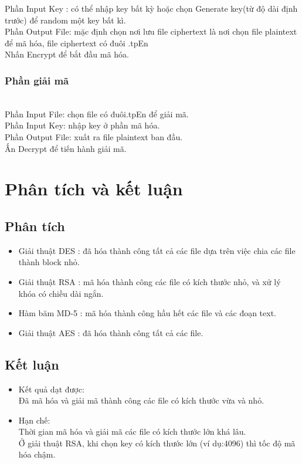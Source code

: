 \documentclass[paper=a4, fontsize=11pt]{scrartcl}	%
\numberwithin{equation}{section}															%
\numberwithin{figure}{section}																%
\numberwithin{table}{section}																%
\begin{document}
 		
		Phần Input Key : có thể nhập key bất kỳ hoặc chọn Generate key(từ độ dài định trước) để random một key bất kì.\\
		
		
		Phần Output File: mặc định chọn nơi lưu file ciphertext là nơi chọn file plaintext để mã hóa, file ciphertext có đuôi .tpEn\\
			
			
		Nhấn Encrypt để bắt đầu mã hóa.
 		\subsubsection{Phần giải mã}\\
 		Phần Input File: chọn file có đuôi.tpEn để giải mã.\\
 		
		Phần Input Key: nhập key ở phần mã hóa.\\
			
		Phần Output File: xuất ra file plaintext ban đầu.\\
		
		Ấn Decrypt để tiến hành giải mã.
\section{Phân tích và kết luận}
	
	\subsection{Phân tích}
	\begin{itemize}
		\item Giải thuật DES : đã hóa thành công tất cả các file dựa trên việc chia các file thành block nhỏ.
		\item Giải thuật RSA : mã hóa thành công các file có kích thước nhỏ, và xử lý khóa có chiều dài ngắn.
		\item Hàm băm MD-5 : mã hóa thành công hầu hết các file và các đoạn text.
		\item Giải thuật AES : đã hóa thành công tất cả các file.
	\end{itemize}
	
	\subsection{Kết luận}
	\begin{itemize}
		\item Kết quả dạt được:\\
		Đã mã hóa và giải mã thành công các file có kích thước vừa và nhỏ.

		\item Hạn chế: \\
		Thời gian mã hóa và giải mã các file có kích thước lớn khá lâu.\\
		
		Ở giải thuật RSA, khi chọn key có kích thước lớn (ví dụ:4096) thì tốc độ mã hóa chậm. \\
	
	\end{itemize}	
	
\end{document}
